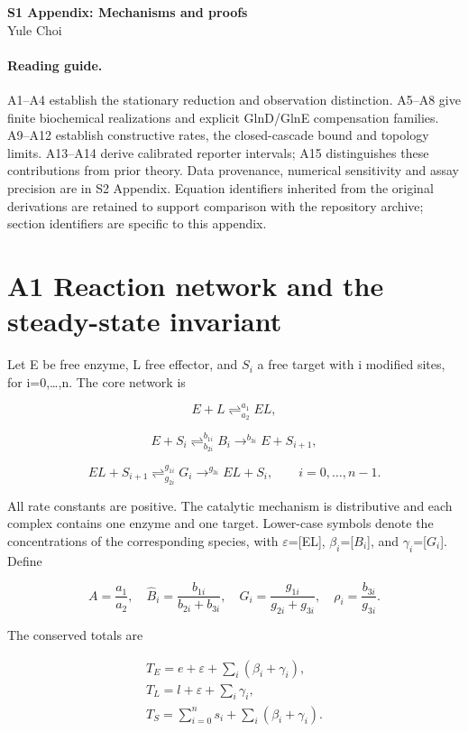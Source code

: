 \documentclass[11pt]{article}
\begin{document}
\begin{center}{\Large\bfseries S1 Appendix: Mechanisms and proofs}\\[0.5em]Yule Choi\end{center}
\onehalfspacing
\paragraph{Reading guide.} A1--A4 establish the stationary reduction and observation distinction. A5--A8 give finite biochemical realizations and explicit GlnD/GlnE compensation families. A9--A12 establish constructive rates, the closed-cascade bound and topology limits. A13--A14 derive calibrated reporter intervals; A15 distinguishes these contributions from prior theory. Data provenance, numerical sensitivity and assay precision are in S2 Appendix. Equation identifiers inherited from the original derivations are retained to support comparison with the repository archive; section identifiers are specific to this appendix.
\section*{A1 Reaction network and the steady-state invariant}

Let E be free enzyme, L free effector, and $S_i$ a free target with i modified sites, for i=0,\ldots{},n. The core network is


\[
E+L \mathrel{\mathop{\rightleftharpoons}^{a_1}_{a_2}} EL, \tag{S1}
\]

\[
E+S_i \mathrel{\mathop{\rightleftharpoons}^{b_{1i}}_{b_{2i}}} B_i
\mathrel{\mathop{\longrightarrow}^{b_{3i}}} E+S_{i+1}, \tag{S2}
\]

\[
EL+S_{i+1} \mathrel{\mathop{\rightleftharpoons}^{g_{1i}}_{g_{2i}}} G_i
\mathrel{\mathop{\longrightarrow}^{g_{3i}}} EL+S_i,\qquad i=0,\ldots,n-1. \tag{S3}
\]

All rate constants are positive. The catalytic mechanism is distributive and each complex contains one enzyme and one target. Lower-case symbols denote the concentrations of the corresponding species, with $\varepsilon$=[EL], $\beta_i$=[$B_i$], and $\gamma_i$=[$G_i$]. Define


\[
A=\frac{a_1}{a_2},\quad
\widehat B_i=\frac{b_{1i}}{b_{2i}+b_{3i}},\quad
\widehat G_i=\frac{g_{1i}}{g_{2i}+g_{3i}},\quad
\rho_i=\frac{b_{3i}}{g_{3i}}. \tag{S4}
\]

The conserved totals are


\[
\begin{aligned}
T_E=e+\varepsilon+\sum_i(\beta_i+\gamma_i),\\
T_L=l+\varepsilon+\sum_i\gamma_i,\\
T_S=\sum_{i=0}^{n}s_i+\sum_i(\beta_i+\gamma_i).
\end{aligned} \tag{S5}
\]
\end{document}
